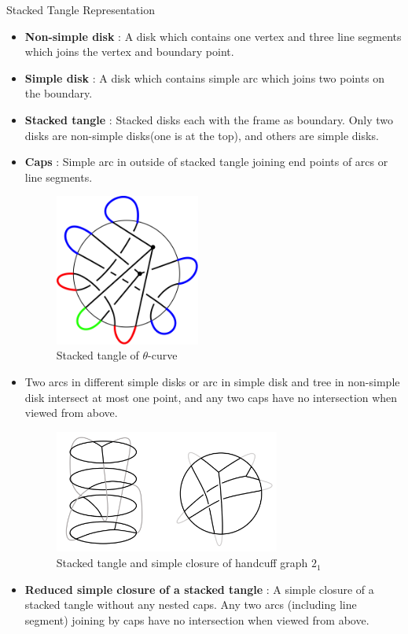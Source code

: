 \documentclass[final]{beamer}
\begin{document}
\begin{frame}[t]
\begin{columns}[t]
  \begin{block}{Stacked Tangle Representation}
    \begin{itemize}
    \item \textbf{Non-simple disk} : A disk which contains one vertex and three line segments which joins the vertex and boundary point. 
    \item \textbf{Simple disk} : A disk which contains simple arc which joins two points on the boundary.
    \item \textbf{Stacked tangle} : Stacked disks each with the frame as boundary. Only two disks are non-simple disks(one is at the top), and others are simple disks. \\
    \item \textbf{Caps} : Simple arc in outside of stacked tangle joining end points of arcs or line segments. \\
    \begin{figure}
      \centering
      \includegraphics[width=0.45\textwidth]{figure/stacked_theta.png}
      \caption{Stacked tangle of $\theta$-curve}
    \end{figure}
    \item Two arcs in different simple disks or arc in simple disk and tree in non-simple disk intersect at most one point, and any two caps have no intersection when viewed from above.
    \begin{figure}
      \centering
      \includegraphics[width=0.7\textwidth]{../Midterm_Poster/figure/stacked_tangle.png}
      \caption{Stacked tangle and simple closure of handcuff graph $2_1$}
    \end{figure}
    \item \textbf{Reduced simple closure of a stacked tangle} : A simple closure of a stacked tangle without any nested caps. Any two arcs (including line segment) joining by caps have no intersection when viewed from above.
    

\end{itemize}
\end{block}
\end{columns}
\end{frame}
\end{document}
